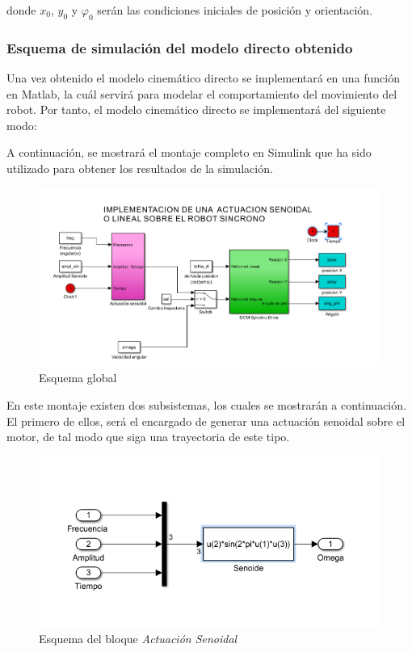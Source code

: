 \documentclass[a4paper,twoside]{article}
\begin{document}
	donde $x_0$, $y_0$ y $\varphi_0$ serán las condiciones iniciales de posición y orientación.\\
	\subsubsection{Esquema de simulación del modelo directo obtenido}
	Una vez obtenido el modelo cinemático directo se implementará en una función en Matlab, la cuál servirá para modelar el comportamiento del movimiento del robot. Por tanto, el modelo cinemático directo se implementará del siguiente modo:
	

	A continuación, se mostrará el montaje completo en Simulink que ha sido utilizado para obtener los resultados de la simulación.
	\begin{figure}[h!]
		\centering
		\includegraphics[width=.8\textwidth]{simulink_MCD_1}
		\caption{Esquema global}
	\end{figure}

En este montaje existen dos subsistemas, los cuales se mostrarán a continuación. El primero de ellos, será el encargado de generar una actuación senoidal sobre el motor, de tal modo que siga una trayectoria de este tipo.
\begin{figure}[h!]
	\centering
	\includegraphics[width=.5\textwidth]{simulink_MCD_2}
	\caption{Esquema del bloque \textit{Actuación Senoidal}}
\end{figure}
\end{document}
